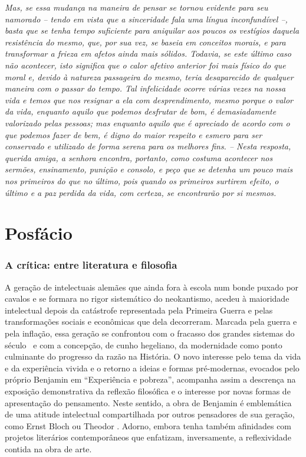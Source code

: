 \emph{Mas, se essa mudança na maneira de pensar se tornou evidente para
seu namorado -- tendo em vista que a sinceridade fala uma língua
inconfundível --, basta que se tenha tempo suficiente para aniquilar aos
poucos os vestígios daquela resistência do mesmo, que, por sua vez, se
baseia em conceitos morais, e para transformar a frieza em afetos ainda
mais sólidos. Todavia, se este último caso não acontecer, isto significa
que o calor afetivo anterior foi mais físico do que moral e, devido à
natureza passageira do mesmo, teria desaparecido de qualquer maneira com
o passar do tempo. Tal infelicidade ocorre várias vezes na nossa vida e
temos que nos resignar a ela com desprendimento, mesmo porque o valor da
vida, enquanto aquilo que podemos desfrutar de bom, é demasiadamente
valorizado pelas pessoas; mas enquanto aquilo que é apreciado de acordo
com o que podemos fazer de bem, é digno do maior respeito e esmero para
ser conservado e utilizado de forma serena para os melhores fins. --
Nesta resposta, querida amiga, a senhora encontra, portanto, como
costuma acontecer nos sermões, ensinamento, punição e consolo, e peço
que se detenha um pouco mais nos primeiros do que no último, pois quando
os primeiros surtirem efeito, o último e a paz perdida da vida, com
certeza, se encontrarão por si mesmos.}

\part{Posfácio}


\section{A crítica: entre literatura e filosofia}

A geração de intelectuais alemães que ainda fora à escola num bonde
puxado por cavalos e se formara no rigor sistemático do neokantismo,
acedeu à maioridade intelectual depois da catástrofe representada pela
Primeira Guerra e pelas transformações sociais e econômicas que dela
decorreram. Marcada pela guerra e pela inflação, essa geração se
confrontou com o fracasso dos grandes sistemas do século~ e com a
concepção, de cunho hegeliano, da modernidade como ponto culminante do
progresso da razão na História. O novo interesse pelo tema da vida e da
experiência vivida e o retorno a ideias e formas pré-modernas, evocados
pelo próprio Benjamin em ``Experiência e pobreza'', acompanha assim a
descrença na exposição demonstrativa da reflexão filosófica e o
interesse por novas formas de apresentação do pensamento. Neste sentido,
a obra de Benjamin é emblemática de uma atitude intelectual
compartilhada por outros pensadores de sua geração, como Ernst Bloch ou
Theodor . Adorno, embora tenha também afinidades com projetos
literários contemporâneos que enfatizam, inversamente, a reflexividade
contida na obra de arte.

